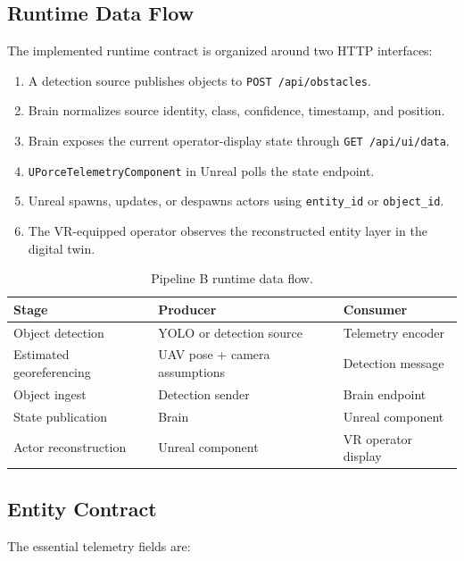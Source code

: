 \documentclass[11pt,a4paper]{article}
\newcommand{\code}[1]{\texttt{#1}}
\begin{document}
\subsection{Runtime Data Flow}

The implemented runtime contract is organized around two HTTP interfaces:

\begin{enumerate}
    \item A detection source publishes objects to \code{POST /api/obstacles}.
    \item Brain normalizes source identity, class, confidence, timestamp, and position.
    \item Brain exposes the current operator-display state through \code{GET /api/ui/data}.
    \item \code{UPorceTelemetryComponent} in Unreal polls the state endpoint.
    \item Unreal spawns, updates, or despawns actors using \code{entity\_id} or \code{object\_id}.
    \item The VR-equipped operator observes the reconstructed entity layer in the digital twin.
\end{enumerate}

\begin{table}[H]
\centering
\caption{Pipeline B runtime data flow.}
\label{tab:pipeline-b-runtime}
\begin{tabular}{@{}lll@{}}
\toprule
Stage & Producer & Consumer \\
\midrule
Object detection & YOLO or detection source & Telemetry encoder \\
Estimated georeferencing & UAV pose + camera assumptions & Detection message \\
Object ingest & Detection sender & Brain endpoint \\
State publication & Brain & Unreal component \\
Actor reconstruction & Unreal component & VR operator display \\
\bottomrule
\end{tabular}
\end{table}

\subsection{Entity Contract}

The essential telemetry fields are:
\end{document}
